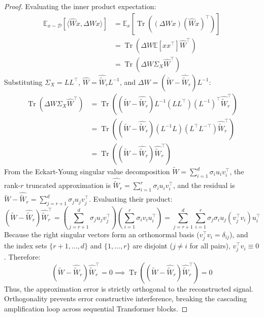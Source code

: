 \documentclass{article}
\begin{document}
\begin{proof}
Evaluating the inner product expectation:
\begin{align}
    \mathbb{E}_{x \sim \mathcal{D}}\left[ \langle \hat{W} x, \Delta W x \rangle \right] &= \mathbb{E}_x \left[ \operatorname{Tr}\left( (\Delta W x) (\hat{W} x)^\top \right) \right] \nonumber \\
    &= \operatorname{Tr}\left( \Delta W \mathbb{E}[x x^\top] \hat{W}^\top \right) \nonumber \\
    &= \operatorname{Tr}\left( \Delta W \Sigma_X \hat{W}^\top \right)
\end{align}
Substituting $\Sigma_X = L L^\top$, $\hat{W} = \hat{\tilde{W}}_r L^{-1}$, and $\Delta W = (\tilde{W} - \hat{\tilde{W}}_r) L^{-1}$:
\begin{align}
    \operatorname{Tr}\left( \Delta W \Sigma_X \hat{W}^\top \right) &= \operatorname{Tr}\left( (\tilde{W} - \hat{\tilde{W}}_r) L^{-1} (L L^\top) (L^{-1})^\top \hat{\tilde{W}}_r^\top \right) \nonumber \\
    &= \operatorname{Tr}\left( (\tilde{W} - \hat{\tilde{W}}_r) (L^{-1} L) (L^\top L^{-\top}) \hat{\tilde{W}}_r^\top \right) \nonumber \\
    &= \operatorname{Tr}\left( (\tilde{W} - \hat{\tilde{W}}_r) \hat{\tilde{W}}_r^\top \right)
\end{align}
From the Eckart-Young singular value decomposition $\tilde{W} = \sum_{i=1}^d \sigma_i u_i v_i^\top$, the rank-$r$ truncated approximation is $\hat{\tilde{W}}_r = \sum_{i=1}^r \sigma_i u_i v_i^\top$, and the residual is $\tilde{W} - \hat{\tilde{W}}_r = \sum_{j=r+1}^d \sigma_j u_j v_j^\top$.
Evaluating their product:
\begin{equation}
    (\tilde{W} - \hat{\tilde{W}}_r) \hat{\tilde{W}}_r^\top = \left( \sum_{j=r+1}^d \sigma_j u_j v_j^\top \right) \left( \sum_{i=1}^r \sigma_i v_i u_i^\top \right) = \sum_{j=r+1}^d \sum_{i=1}^r \sigma_j \sigma_i u_j (v_j^\top v_i) u_i^\top
\end{equation}
Because the right singular vectors form an orthonormal basis ($v_j^\top v_i = \delta_{ij}$), and the index sets $\{r+1, \dots, d\}$ and $\{1, \dots, r\}$ are disjoint ($j \ne i$ for all pairs), $v_j^\top v_i \equiv 0$.
Therefore:
\begin{equation}
    (\tilde{W} - \hat{\tilde{W}}_r) \hat{\tilde{W}}_r^\top = 0 \implies \operatorname{Tr}\left( (\tilde{W} - \hat{\tilde{W}}_r) \hat{\tilde{W}}_r^\top \right) = 0
\end{equation}
Thus, the approximation error is strictly orthogonal to the reconstructed signal. Orthogonality prevents error constructive interference, breaking the cascading amplification loop across sequential Transformer blocks.
\end{proof}
\end{document}
